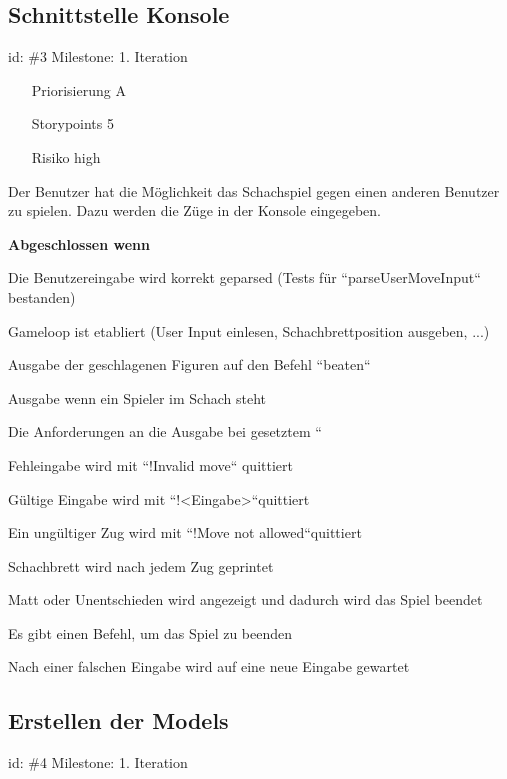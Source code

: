 
\subsection*{Schnittstelle Konsole}
id: \#3 Milestone: 1. Iteration\\

\begin{itemize}
\item[Priorisierung] A
\item[Storypoints] 5
\item[Risiko] high
\end{itemize}

Der Benutzer hat die Möglichkeit das Schachspiel gegen einen anderen Benutzer zu spielen. Dazu werden die Züge in der Konsole eingegeben.

\textbf{Abgeschlossen wenn}
\begin{todolist}
    \item[\done]  Die Benutzereingabe wird korrekt geparsed (Tests für ``parseUserMoveInput`` bestanden)
  \item[\done]  Gameloop ist etabliert (User Input einlesen, Schachbrettposition ausgeben, ...)
  \item[\done]  Ausgabe der geschlagenen Figuren auf den Befehl ``beaten``
  \item[\done]  Ausgabe wenn ein Spieler im Schach steht
  \item[\done]  Die Anforderungen an die Ausgabe bei gesetztem ``
  \item[\done]  Fehleingabe wird mit ``!Invalid move`` quittiert
  \item[\done]  Gültige Eingabe wird mit ``!<Eingabe>``quittiert
  \item[\done]  Ein ungültiger Zug wird mit ``!Move not allowed``quittiert
  \item[\done]  Schachbrett wird nach jedem Zug geprintet
  \item[\done]  Matt oder Unentschieden wird angezeigt und dadurch wird das Spiel beendet
  \item[\done]  Es gibt einen Befehl, um das Spiel zu beenden
  \item[\done]  Nach einer falschen Eingabe wird auf eine neue Eingabe gewartet

\end{todolist}


\subsection*{Erstellen der Models}
id: \#4 Milestone: 1. Iteration\\

